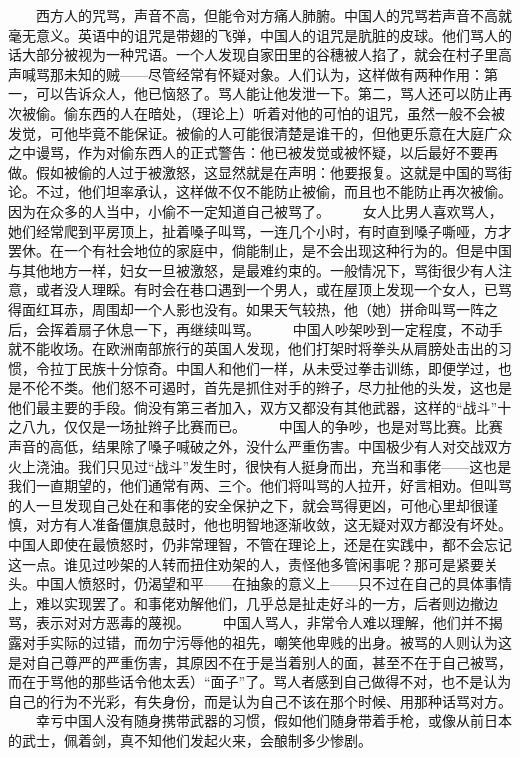 \documentclass[12pt,oneside]{book}
\begin{document}
\begin{common-format}
　　西方人的咒骂，声音不高，但能令对方痛人肺腑。中国人的咒骂若声音不高就毫无意义。英语中的诅咒是带翅的飞弹，中国人的诅咒是肮脏的皮球。他们骂人的话大部分被视为一种咒语。一个人发现自家田里的谷穗被人掐了，就会在村子里高声喊骂那未知的贼——尽管经常有怀疑对象。人们认为，这样做有两种作用：第一，可以告诉众人，他已恼怒了。骂人能让他发泄一下。第二，骂人还可以防止再次被偷。偷东西的人在暗处，（理论上）听着对他的可怕的诅咒，虽然一般不会被发觉，可他毕竟不能保证。被偷的人可能很清楚是谁干的，但他更乐意在大庭广众之中谩骂，作为对偷东西人的正式警告：他已被发觉或被怀疑，以后最好不要再做。假如被偷的人过于被激怒，这显然就是在声明：他要报复。这就是中国的骂街论。不过，他们坦率承认，这样做不仅不能防止被偷，而且也不能防止再次被偷。因为在众多的人当中，小偷不一定知道自己被骂了。 
　　女人比男人喜欢骂人，她们经常爬到平房顶上，扯着嗓子叫骂，一连几个小时，有时直到嗓子嘶哑，方才罢休。在一个有社会地位的家庭中，倘能制止，是不会出现这种行为的。但是中国与其他地方一样，妇女一旦被激怒，是最难约束的。一般情况下，骂街很少有人注意，或者没人理睬。有时会在巷口遇到一个男人，或在屋顶上发现一个女人，已骂得面红耳赤，周围却一个人影也没有。如果天气较热，他（她）拼命叫骂一阵之后，会挥着扇子休息一下，再继续叫骂。 
　　中国人吵架吵到一定程度，不动手就不能收场。在欧洲南部旅行的英国人发现，他们打架时将拳头从肩膀处击出的习惯，令拉丁民族十分惊奇。中国人和他们一样，从未受过拳击训练，即便学过，也是不伦不类。他们怒不可遏时，首先是抓住对手的辫子，尽力扯他的头发，这也是他们最主要的手段。倘没有第三者加入，双方又都没有其他武器，这样的“战斗”十之八九，仅仅是一场扯辫子比赛而已。 
　　中国人的争吵，也是对骂比赛。比赛声音的高低，结果除了嗓子喊破之外，没什么严重伤害。中国极少有人对交战双方火上浇油。我们只见过“战斗”发生时，很快有人挺身而出，充当和事佬——这也是我们一直期望的，他们通常有两、三个。他们将叫骂的人拉开，好言相劝。但叫骂的人一旦发现自己处在和事佬的安全保护之下，就会骂得更凶，可他心里却很谨慎，对方有人准备僵旗息鼓时，他也明智地逐渐收敛，这无疑对双方都没有坏处。中国人即使在最愤怒时，仍非常理智，不管在理论上，还是在实践中，都不会忘记这一点。谁见过吵架的人转而扭住劝架的人，责怪他多管闲事呢？那可是紧要关头。中国人愤怒时，仍渴望和平——在抽象的意义上——只不过在自己的具体事情上，难以实现罢了。和事佬劝解他们，几乎总是扯走好斗的一方，后者则边撤边骂，表示对对方恶毒的蔑视。 
　　中国人骂人，非常令人难以理解，他们并不揭露对手实际的过错，而勿宁污辱他的祖先，嘲笑他卑贱的出身。被骂的人则认为这是对自己尊严的严重伤害，其原因不在于是当着别人的面，甚至不在于自己被骂，而在于骂他的那些话令他太丢）“面子”了。骂人者感到自己做得不对，也不是认为自己的行为不光彩，有失身份，而是认为自己不该在那个时候、用那种话骂对方。 
　　幸亏中国人没有随身携带武器的习惯，假如他们随身带着手枪，或像从前日本的武士，佩着剑，真不知他们发起火来，会酿制多少惨剧。 

\end{common-format}
\end{document}
